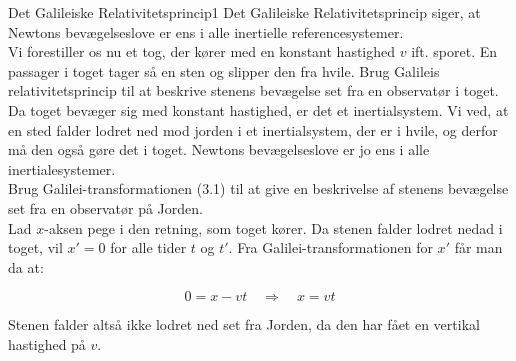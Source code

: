 \begin{opgave}{Det Galileiske Relativitetsprincip}{1}
	Det Galileiske Relativitetsprincip siger, at Newtons bevægelseslove er ens i alle inertielle referencesystemer.\\
	Vi forestiller os nu et tog, der kører med en konstant hastighed $v$ ift. sporet. En passager i toget tager så en sten og slipper den fra hvile.  
	\opg Brug Galileis relativitetsprincip til at beskrive stenens bevægelse set fra en observatør i toget.\\
	
	Da toget bevæger sig med konstant hastighed, er det et inertialsystem. Vi ved, at en sted falder lodret ned mod jorden i et inertialsystem, der er i hvile, og derfor må den også gøre det i toget. Newtons bevægelseslove er jo ens i alle inertialesystemer.\\  
	\opg Brug Galilei-transformationen (3.1) til at give en beskrivelse af stenens bevægelse set fra en observatør på Jorden.\\
	
	Lad $x$-aksen pege i den retning, som toget kører. Da stenen falder lodret nedad i toget, vil $x'=0$ for alle tider $t$ og $t'$. Fra Galilei-transformationen for $x'$ får man da at:
	
	$$0 = x-vt \quad \Rightarrow \quad x = vt$$
	
	Stenen falder altså ikke lodret ned set fra Jorden, da den har fået en vertikal hastighed på $v$. 
\end{opgave}

